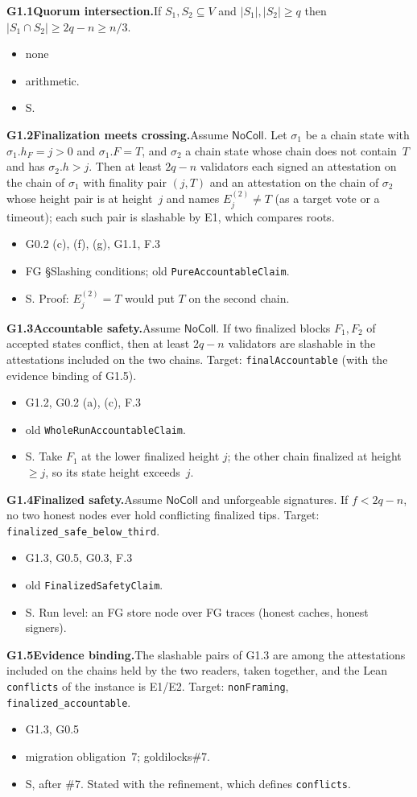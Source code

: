 \documentclass{article}
\newcommand{\dagnode}[6]{%
\par\medskip\noindent\textbf{#1\enspace #2.}\enspace #3
\begin{itemize}[leftmargin=2.2em,itemsep=0pt,topsep=2pt]
\item[\emph{Uses}] #4
\item[\emph{Evid.}] #5
\item[\emph{Task}] #6
\end{itemize}}
\begin{document}
\dagnode{G1.1}{Quorum intersection}{If $S_1,S_2\subseteq V$ and
$|S_1|,|S_2|\geq q$ then $|S_1\cap S_2|\geq 2q-n\geq n/3$.}
{none}{arithmetic.}{S.}

\dagnode{G1.2}{Finalization meets crossing}{Assume $\mathsf{NoColl}$.  Let $\sigma_1$ be a chain state
with $\sigma_1.h_F=j>0$ and $\sigma_1.F=T$, and $\sigma_2$ a chain state whose
chain does not contain~$T$ and has $\sigma_2.h>j$.  Then at least $2q-n$
validators each signed an attestation on the chain of $\sigma_1$ with finality
pair $(j,T)$ and an attestation on the chain of $\sigma_2$ whose height pair is
at height~$j$ and names $E^{(2)}_j\neq T$ (as a target vote or a timeout);
each such pair is slashable by E1, which compares roots.}
{G0.2 (c), (f), (g), G1.1, F.3}{FG \S Slashing conditions; old
\texttt{PureAccountableClaim}.}{S.  Proof: $E^{(2)}_j=T$ would put $T$ on the
second chain.}

\dagnode{G1.3}{Accountable safety}{Assume $\mathsf{NoColl}$.  If two finalized blocks $F_1,F_2$ of
accepted states conflict, then at least $2q-n$ validators are slashable in the
attestations included on the two chains.  Target:
\texttt{finalAccountable} (with the evidence binding of G1.5).}
{G1.2, G0.2 (a), (c), F.3}{old \texttt{WholeRunAccountableClaim}.}{S.  Take $F_1$
at the lower finalized height $j$; the other chain finalized at height
$\geq j$, so its state height exceeds~$j$.}

\dagnode{G1.4}{Finalized safety}{Assume $\mathsf{NoColl}$ and unforgeable
signatures.  If $f<2q-n$, no two honest nodes ever hold
conflicting finalized tips.  Target: \texttt{finalized\_safe\_below\_third}.}
{G1.3, G0.5, G0.3, F.3}{old \texttt{FinalizedSafetyClaim}.}{S.  Run level: an FG
store node over FG traces (honest caches, honest signers).}

\dagnode{G1.5}{Evidence binding}{The slashable pairs of G1.3 are among the
attestations included on the chains held by the two readers, taken together, and the Lean \texttt{conflicts} of the instance is
E1/E2.  Target: \texttt{nonFraming}, \texttt{finalized\_accountable}.}
{G1.3, G0.5}{migration obligation~7; goldilocks\#7.}{S, after \#7.  Stated with the
refinement, which defines \texttt{conflicts}.}
\end{document}
